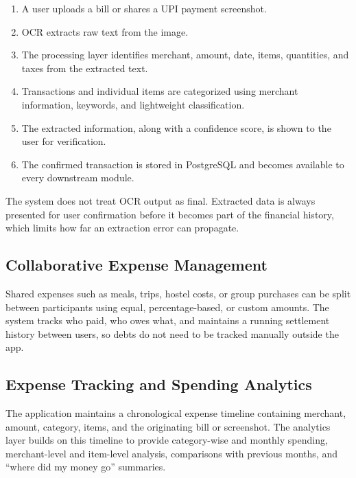 \documentclass[11pt,a4paper]{article}
\begin{document}
\begin{enumerate}

    \item A user uploads a bill or shares a UPI payment screenshot.

    \item OCR extracts raw text from the image.

    \item The processing layer identifies merchant, amount, date, items,
    quantities, and taxes from the extracted text.

    \item Transactions and individual items are categorized using
    merchant information, keywords, and lightweight classification.

    \item The extracted information, along with a confidence score, is
    shown to the user for verification.

    \item The confirmed transaction is stored in PostgreSQL and becomes
    available to every downstream module.

\end{enumerate}

The system does not treat OCR output as final. Extracted data is always
presented for user confirmation before it becomes part of the financial
history, which limits how far an extraction error can propagate.

\subsection{Collaborative Expense Management}

Shared expenses such as meals, trips, hostel costs, or group purchases
can be split between participants using equal, percentage-based, or custom
amounts. The system tracks who paid, who owes what, and maintains a
running settlement history between users, so debts do not need to be
tracked manually outside the app.

\subsection{Expense Tracking and Spending Analytics}

The application maintains a chronological expense timeline containing
merchant, amount, category, items, and the originating bill or
screenshot. The analytics layer builds on this timeline to provide
category-wise and monthly spending, merchant-level and item-level
analysis, comparisons with previous months, and ``where did my money
go'' summaries.
\end{document}

